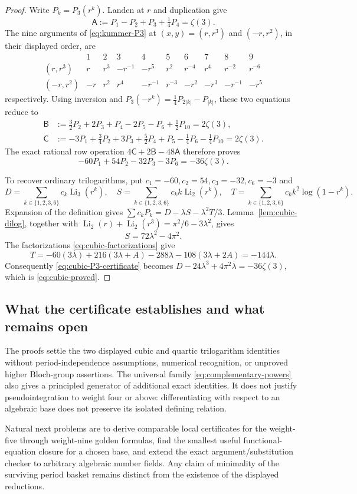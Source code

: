 \begin{proof}
Write $P_k=P_3(r^k)$. Landen at $r$ and duplication give
\[
\mathsf A:=P_1-P_2+P_3+\tfrac14P_4=\zeta(3).
\]
The nine arguments of \eqref{eq:kummer-P3} at
$(x,y)=(r,r^3)$ and $(-r,r^2)$, in their displayed order, are
\[
\begin{array}{c|rrrrrrrrr}
 &1&2&3&4&5&6&7&8&9\\ \hline
(r,r^3)&r&r^3&-r^{-1}&-r^5&r^2&r^{-4}&r^4&r^{-2}&r^{-6}\\
(-r,r^2)&-r&r^2&r^4&-r^{-1}&r^{-3}&-r^2&-r^3&-r^{-1}&-r^5
\end{array}
\]
respectively. Using inversion and
$P_3(-r^k)=\tfrac14P_{2|k|}-P_{|k|}$, these two equations reduce to
\begin{align*}
\mathsf B&:=\tfrac32P_2+2P_3+P_4-2P_5-P_6+\tfrac12P_{10}
 =2\zeta(3),\\
\mathsf C&:=-3P_1+\tfrac34P_2+3P_3+\tfrac52P_4+P_5
 -\tfrac14P_6-\tfrac14P_{10}=2\zeta(3).
\end{align*}
The exact rational row operation $4\mathsf C+2\mathsf B-48\mathsf A$
therefore proves
\begin{equation}
-60P_1+54P_2-32P_3-3P_6=-36\zeta(3).
\label{eq:cubic-P3-certificate}
\end{equation}

To recover ordinary trilogarithms, put
$c_1=-60,c_2=54,c_3=-32,c_6=-3$ and
\[
D=\sum_{k\in\{1,2,3,6\}}c_k\operatorname{Li}_3(r^k),\quad
S=\sum_{k\in\{1,2,3,6\}}c_k k\operatorname{Li}_2(r^k),\quad
T=\sum_{k\in\{1,2,3,6\}}c_k k^2\log(1-r^k).
\]
Expansion of the definition gives
$\sum c_kP_k=D-\lambda S-\lambda^2 T/3$.
Lemma~\ref{lem:cubic-dilog}, together with
$\operatorname{Li}_2(r)+\operatorname{Li}_2(r^3)
=\pi^2/6-3\lambda^2$, gives
\[
S=72\lambda^2-4\pi^2.
\]
The factorizations \eqref{eq:cubic-factorizations} give
\[
T=-60(3\lambda)+216(3\lambda+A)
 -288\lambda-108(3\lambda+2A)=-144\lambda.
\]
Consequently \eqref{eq:cubic-P3-certificate} becomes
$D-24\lambda^3+4\pi^2\lambda=-36\zeta(3)$, which is
\eqref{eq:cubic-proved}.
\end{proof}

\subsection{What the certificate establishes and what remains open}

The proofs settle the two displayed cubic and quartic trilogarithm
identities without period-independence assumptions, numerical recognition,
or unproved higher Bloch-group assertions. The universal family
\eqref{eq:complementary-powers} also gives a principled generator of
additional exact identities. It does not justify pseudointegration to
weight four or above: differentiating with respect to an algebraic base
does not preserve its isolated defining relation.

Natural next problems are to derive comparable local certificates for the
weight-five through weight-nine golden formulas, find the smallest useful
functional-equation closure for a chosen base, and extend the exact
argument/substitution checker to arbitrary algebraic number fields.
Any claim of minimality of the surviving period basket remains distinct
from the existence of the displayed reductions.

